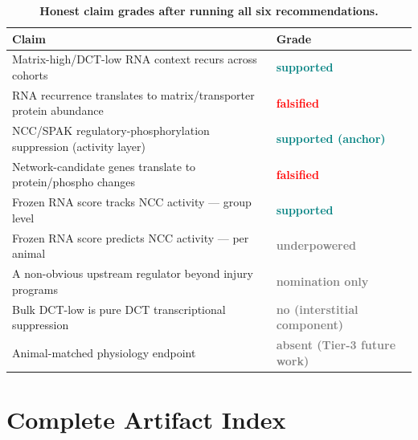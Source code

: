\documentclass[10pt]{article}
\begin{document}
\begin{table}[H]
\centering
\caption{\textbf{Honest claim grades after running all six recommendations.}}
\begin{tabularx}{\textwidth}{Xl}
\toprule
Claim & Grade \\
\midrule
Matrix-high/DCT-low RNA context recurs across cohorts & \textcolor{teal}{\textbf{supported}} \\
RNA recurrence translates to matrix/transporter protein abundance & \textcolor{red}{\textbf{falsified}} \\
NCC/SPAK regulatory-phosphorylation suppression (activity layer) & \textcolor{teal}{\textbf{supported (anchor)}} \\
Network-candidate genes translate to protein/phospho changes & \textcolor{red}{\textbf{falsified}} \\
Frozen RNA score tracks NCC activity --- group level & \textcolor{teal}{\textbf{supported}} \\
Frozen RNA score predicts NCC activity --- per animal & \textcolor{gray}{\textbf{underpowered}} \\
A non-obvious upstream regulator beyond injury programs & \textcolor{gray}{\textbf{nomination only}} \\
Bulk DCT-low is pure DCT transcriptional suppression & \textcolor{gray}{\textbf{no (interstitial component)}} \\
Animal-matched physiology endpoint & \textcolor{gray}{\textbf{absent (Tier-3 future work)}} \\
\bottomrule
\end{tabularx}
\end{table}

\section{Complete Artifact Index}
\end{document}
